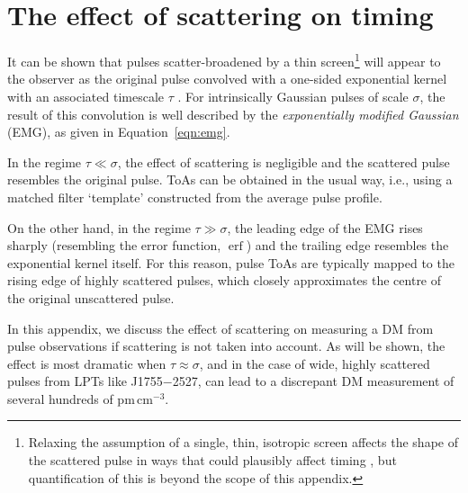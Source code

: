 \documentclass[fleqn,usenatbib]{mnras}
\newcommand{\src}{J1755$-$2527}
\DeclareMathOperator{\erf}{erf}
\newcommand{\Eqn}{Equation}
\begin{document}
\section{The effect of scattering on timing}
\label{app:scattering_dm}

It can be shown that pulses scatter-broadened by a thin screen\footnote{Relaxing the assumption of a single, thin, isotropic screen affects the shape of the scattered pulse in ways that could plausibly affect timing \citep{2009MNRAS.395.1391R}, but quantification of this is beyond the scope of this appendix.} will appear to the observer as the original pulse convolved with a one-sided exponential kernel with an associated timescale $\tau$ \citep{1972MNRAS.157...55W,1973MNRAS.163..345W}.
For intrinsically Gaussian pulses of scale $\sigma$, the result of this convolution is well described by the \textit{exponentially modified Gaussian} (EMG), as given in \Eqn~\ref{eqn:emg}.

In the regime $\tau \ll \sigma$, the effect of scattering is negligible and the scattered pulse resembles the original pulse.
ToAs can be obtained in the usual way, i.e., using a matched filter `template' constructed from the average pulse profile.

On the other hand, in the regime $\tau \gg \sigma$, the leading edge of the EMG rises sharply (resembling the error function, $\erf$) and the trailing edge resembles the exponential kernel itself.
For this reason, pulse ToAs are typically mapped to the rising edge of highly scattered pulses, which closely approximates the centre of the original unscattered pulse.

In this appendix, we discuss the effect of scattering on measuring a DM from pulse observations if scattering is not taken into account.
As will be shown, the effect is most dramatic when $\tau \approx \sigma$, and in the case of wide, highly scattered pulses from LPTs like \src{}, can lead to a discrepant DM measurement of several hundreds of pm\,cm$^{-3}$.
\end{document}
